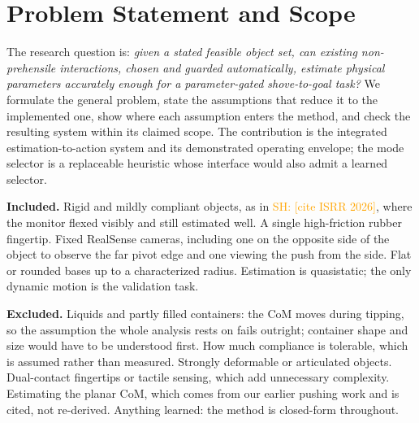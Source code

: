 \documentclass[10pt, conference]{IEEEtran}
\newcommand{\sh}[1]{\textcolor{orange}{SH: #1}}
\newcommand{\isrr}{\sh{[cite ISRR 2026]}}
\begin{document}
\section{Problem Statement and Scope} \label{sec:scope}

The research question is: \emph{given a stated feasible object set, can existing non-prehensile interactions, chosen and guarded automatically, estimate physical parameters accurately enough for a parameter-gated shove-to-goal task?} We formulate the general problem, state the assumptions that reduce it to the implemented one, show where each assumption enters the method, and check the resulting system within its claimed scope. The contribution is the integrated estimation-to-action system and its demonstrated operating envelope; the mode selector is a replaceable heuristic whose interface would also admit a learned selector.

\noindent \textbf{Included.} Rigid and mildly compliant objects, as in \isrr{}, where the monitor flexed visibly and still estimated well. A single high-friction rubber fingertip. Fixed RealSense cameras, including one on the opposite side of the object to observe the far pivot edge and one viewing the push from the side. Flat or rounded bases up to a characterized radius. Estimation is quasistatic; the only dynamic motion is the validation task.

\noindent \textbf{Excluded.} Liquids and partly filled containers: the CoM moves during tipping, so the assumption the whole analysis rests on fails outright; container shape and size would have to be understood first. How much compliance is tolerable, which is assumed rather than measured. Strongly deformable or articulated objects. Dual-contact fingertips or tactile sensing, which add unnecessary complexity. Estimating the planar CoM, which comes from our earlier pushing work and is cited, not re-derived. Anything learned: the method is closed-form throughout.
\end{document}
